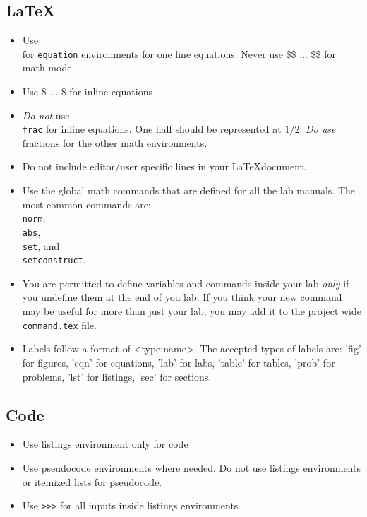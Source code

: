\subsection{\LaTeX}
\begin{itemize}
\item Use \texttt{\\[\\]} for \texttt{equation} environments for one line equations.  Never use \$\$ ... \$\$ for math mode.
\item Use \$ ... \$ for inline equations
\item \emph{Do not} use \texttt{\\frac} for inline equations.  One half should be represented at $1/2$. \emph{Do use} fractions for the other math environments.
\item Do not include editor/user specific lines in your \LaTeX document.
\item Use the global math commands that are defined for all the lab manuals.  The most common commands are: \texttt{\\norm}, \texttt{\\abs}, \texttt{\\set}, and \texttt{\\setconstruct}.
\item You are permitted to define variables and commands inside your lab \emph{only} if you undefine them at the end of you lab.  If you think your new command may be useful for more than just your lab, you may add it to the project wide \texttt{command.tex} file.
\item Labels follow a format of <type:name>.  The accepted types of labels are: 'fig' for figures, 'eqn' for equations, 'lab' for labs, 'table' for tables, 'prob' for problems, 'lst' for listings, 'sec' for sections.
\end{itemize}


\subsection{Code}
\begin{itemize}
\item Use listings environment only for code
\item Use pseudocode environments where needed.  Do not use listings environments or itemized lists for pseudocode.
\item Use \texttt{>>>} for all inputs inside listings environments.
\end{itemize}

